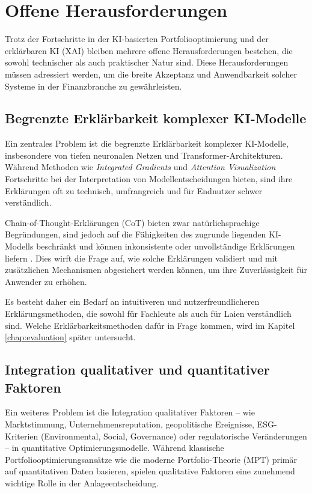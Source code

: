 \section{Offene Herausforderungen}

  Trotz der Fortschritte in der KI-basierten Portfoliooptimierung und der erklärbaren KI (XAI) bleiben mehrere offene Herausforderungen bestehen, die sowohl technischer als auch praktischer Natur sind.
  Diese Herausforderungen müssen adressiert werden, um die breite Akzeptanz und Anwendbarkeit solcher Systeme in der Finanzbranche zu gewährleisten.

  \subsection{Begrenzte Erklärbarkeit komplexer KI-Modelle}

    Ein zentrales Problem ist die begrenzte Erklärbarkeit komplexer KI-Modelle, insbesondere von tiefen neuronalen Netzen und Transformer-Architekturen.
    Während Methoden wie \textit{Integrated Gradients} und \textit{Attention Visualization} Fortschritte bei der Interpretation von Modellentscheidungen bieten, sind ihre Erklärungen oft zu technisch, umfrangreich und für Endnutzer schwer verständlich.

    Chain-of-Thought-Erklärungen (\acs{CoT}) bieten zwar natürlichsprachige Begründungen, sind jedoch auf die Fähigkeiten des zugrunde liegenden KI-Modells beschränkt und können inkonsistente oder unvollständige Erklärungen liefern \autocite[S. 2 und 3]{wei2022}.
    Dies wirft die Frage auf, wie solche Erklärungen validiert und mit zusätzlichen Mechanismen abgesichert werden können, um ihre Zuverlässigkeit für Anwender zu erhöhen.

    Es besteht daher ein Bedarf an intuitiveren und nutzerfreundlicheren Erklärungsmethoden, die sowohl für Fachleute als auch für Laien verständlich sind.
    Welche Erklärbarkeitsmethoden dafür in Frage kommen, wird im Kapitel \ref{chap:evaluation} später untersucht.

  \subsection{Integration qualitativer und quantitativer Faktoren}

    Ein weiteres Problem ist die Integration qualitativer Faktoren -- wie Marktstimmung, Unternehmensreputation, geopolitische Ereignisse, \acs{ESG}-Kriterien (Environmental, Social, Governance) oder regulatorische Veränderungen -- in quantitative Optimierungsmodelle.
    Während klassische Portfoliooptimierungsansätze wie die moderne Portfolio-Theorie (\acs{MPT}) \autocite{markowitz1952} primär auf quantitativen Daten basieren, spielen qualitative Faktoren eine zunehmend wichtige Rolle in der Anlageentscheidung.

